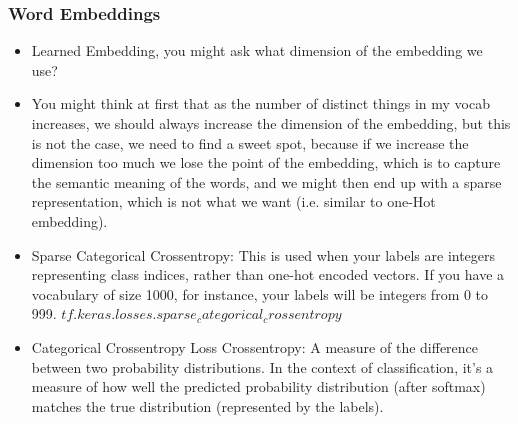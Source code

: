 \documentclass{article}
\begin{document}
  \subsubsection{Word Embeddings}
  \begin{itemize}
    \item Learned Embedding, you might ask what dimension of the embedding we use? 
    \item You might think at first that as the number of distinct things in my vocab increases, we should always increase the dimension of the embedding, but this is not the case, we need to find a sweet spot, because if we increase the dimension too much we lose the point of the embedding, which is to capture the semantic meaning of the words, and we might then end up with a sparse representation, which is not what we want (i.e. similar to one-Hot embedding). 
    \item Sparse Categorical Crossentropy: This is used when your labels are integers representing class indices, rather than one-hot encoded vectors. If you have a vocabulary of size 1000, for instance, your labels will be integers from 0 to 999. $tf.keras.losses.sparse_categorical_crossentropy$
    \item Categorical Crossentropy Loss Crossentropy: A measure of the difference between two probability distributions. In the context of classification, it's a measure of how well the predicted probability distribution (after softmax) matches the true distribution (represented by the labels).
  \end{itemize}
\end{document}
